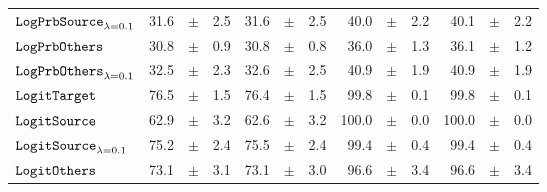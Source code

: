 \documentclass[../main.tex]{subfiles}
\begin{document}
\begin{tabular}{lrrrrrrrrrrrr}
$\mathtt{LogPrbSource}_{\lambda=0.1}$   & 31.6                            & $\pm$                                        & 2.5                        & 31.6                                                                                   & $\pm$ & 2.5                                & 40.0  & $\pm$ & 2.2             & 40.1  & $\pm$ & 2.2                           \\
$\mathtt{LogPrbOthers}_{}$              & 30.8                            & $\pm$                                        & 0.9                        & 30.8                                                                                   & $\pm$ & 0.8                                & 36.0  & $\pm$ & 1.3             & 36.1  & $\pm$ & 1.2                           \\
$\mathtt{LogPrbOthers}_{\lambda=0.1}$   & 32.5                            & $\pm$                                        & 2.3                        & 32.6                                                                                   & $\pm$ & 2.5                                & 40.9  & $\pm$ & 1.9             & 40.9  & $\pm$ & 1.9                           \\
\rowcolor{lightgray}
$\mathtt{LogitTarget}$                 & 76.5                            & $\pm$                                        & 1.5                        & 76.4                                                                                     & $\pm$ & 1.5                                & 99.8  & $\pm$ & 0.1             & 99.8  & $\pm$ & 0.1                           \\
\rowcolor{lightgray}
$\mathtt{LogitSource}_{}$               & 62.9                            & $\pm$                                        & 3.2                        & 62.6                                                                                   & $\pm$ & 3.2                                & 100.0 & $\pm$ & 0.0             & 100.0 & $\pm$ & 0.0                           \\
\rowcolor{lightgray}
$\mathtt{LogitSource}_{\lambda=0.1}$    & 75.2                            & $\pm$                                        & 2.4                        & 75.5                                                                                   & $\pm$ & 2.4                                & 99.4  & $\pm$ & 0.4             & 99.4  & $\pm$ & 0.4                           \\
\rowcolor{lightgray}
$\mathtt{LogitOthers}_{}$               & 73.1                            & $\pm$                                        & 3.1                        & 73.1                                                                                 & $\pm$ & 3.0                                & 96.6  & $\pm$ & 3.4             & 96.6  & $\pm$ & 3.4                           \\

\end{tabular}
\end{document}
